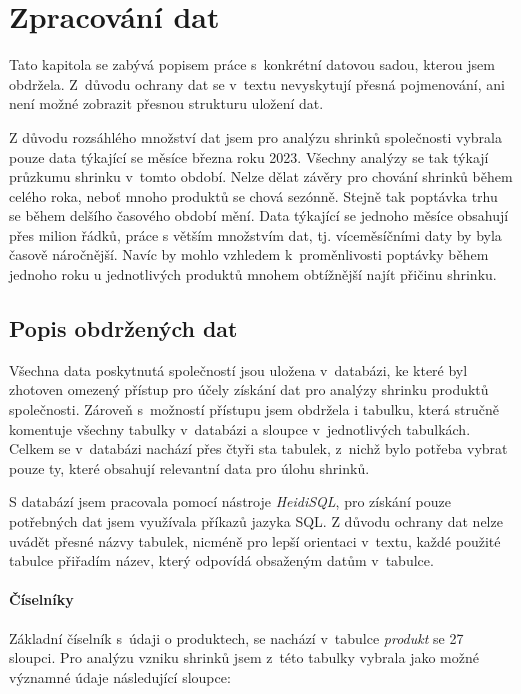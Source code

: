 \chapter{Zpracování dat}

Tato kapitola se zabývá popisem práce s~konkrétní datovou sadou, kterou jsem obdržela. Z~důvodu ochrany dat se v~textu nevyskytují přesná pojmenování, ani není možné zobrazit přesnou strukturu uložení dat. 

Z důvodu rozsáhlého množství dat jsem pro analýzu shrinků společnosti vybrala pouze data týkající se měsíce března roku 2023. Všechny analýzy se tak týkají průzkumu shrinku v~tomto období. Nelze dělat závěry pro chování shrinků během celého roka, neboť mnoho produktů se chová sezónně. Stejně tak poptávka trhu se během delšího časového období mění.  Data týkající se jednoho měsíce obsahují přes milion řádků, práce s větším množstvím dat, tj. víceměsíčními daty by byla časově náročnější. Navíc by mohlo vzhledem k~proměnlivosti poptávky během jednoho roku u jednotlivých produktů mnohem obtížnější najít přičinu shrinku.

\section{Popis obdržených dat}

Všechna data poskytnutá společností jsou uložena v~databázi, ke které byl zhotoven omezený přístup pro účely získání dat pro analýzy shrinku produktů společnosti. Zároveň s~možností přístupu jsem obdržela i tabulku, která stručně komentuje všechny tabulky v~databázi a sloupce v~jednotlivých tabulkách. Celkem se v~databázi nachází přes čtyři sta tabulek, z~nichž bylo potřeba vybrat pouze ty, které obsahují relevantní data pro úlohu shrinků.

S databází jsem pracovala pomocí nástroje \emph{HeidiSQL}, pro získání pouze potřebných dat jsem využívala příkazů jazyka SQL.
Z důvodu ochrany dat nelze uvádět přesné názvy tabulek, nicméně pro lepší orientaci v~textu, každé použité tabulce přiřadím název, který odpovídá obsaženým datům v~tabulce. 

\subsubsection{Číselníky}

Základní číselník s~údaji o produktech, se nachází v~tabulce \emph{produkt} se 27 sloupci. Pro analýzu vzniku shrinků jsem z~této tabulky vybrala jako možné významné údaje následující sloupce:


